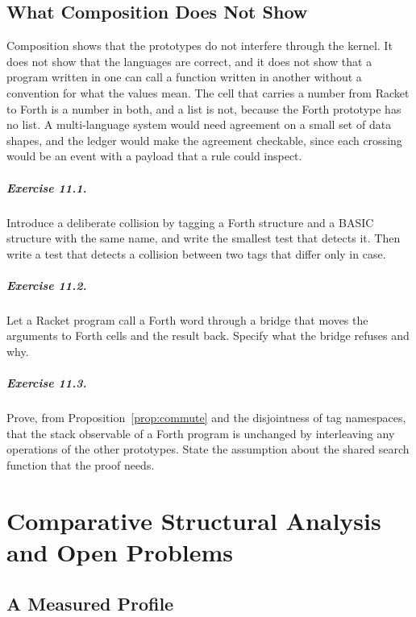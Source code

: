 \section{What Composition Does Not Show}

Composition shows that the prototypes do not interfere through the kernel. It does not show that the languages are correct, and it does not show that a program written in one can call a function written in another without a convention for what the values mean. The cell that carries a number from Racket to Forth is a number in both, and a list is not, because the Forth prototype has no list. A multi-language system would need agreement on a small set of data shapes, and the ledger would make the agreement checkable, since each crossing would be an event with a payload that a rule could inspect.

\paragraph{Exercise 11.1.} Introduce a deliberate collision by tagging a Forth structure and a BASIC structure with the same name, and write the smallest test that detects it. Then write a test that detects a collision between two tags that differ only in case.

\paragraph{Exercise 11.2.} Let a Racket program call a Forth word through a bridge that moves the arguments to Forth cells and the result back. Specify what the bridge refuses and why.

\paragraph{Exercise 11.3.} Prove, from Proposition~\ref{prop:commute} and the disjointness of tag namespaces, that the stack observable of a Forth program is unchanged by interleaving any operations of the other prototypes. State the assumption about the shared search function that the proof needs.

\chapter{Comparative Structural Analysis and Open Problems}

\section{A Measured Profile}

